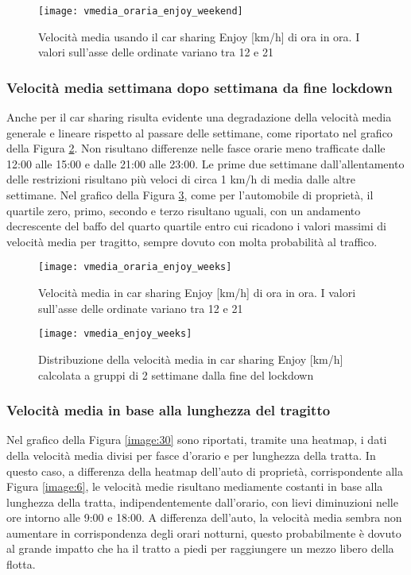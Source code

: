 \begin{figure}[H]
	\centering
	\texttt{[image: vmedia\_oraria\_enjoy\_weekend]}
	\caption{Velocità media usando il car sharing Enjoy [km/h] di ora in ora. I valori sull'asse delle ordinate variano tra 12 e 21}
	\label{image:20}
\end{figure}

\subsubsection{Velocità media settimana dopo settimana da fine lockdown}

Anche per il car sharing risulta evidente una degradazione della velocità media generale e lineare rispetto al passare delle settimane, come riportato nel grafico della Figura \ref{image:16}. Non risultano differenze nelle fasce orarie meno trafficate dalle 12:00 alle 15:00 e dalle 21:00 alle 23:00. Le prime due settimane dall'allentamento delle restrizioni risultano più veloci di circa 1 km/h di media dalle altre settimane. Nel grafico della Figura \ref{image:28}, come per l'automobile di proprietà, il quartile zero, primo, secondo e terzo risultano uguali, con un andamento decrescente del baffo del quarto quartile entro cui ricadono i valori massimi di velocità media per tragitto, sempre dovuto con molta probabilità al traffico.

\begin{figure}[H]
	\centering
	\texttt{[image: vmedia\_oraria\_enjoy\_weeks]}
	\caption{Velocità media in car sharing Enjoy [km/h] di ora in ora. I valori sull'asse delle ordinate variano tra 12 e 21}
	\label{image:16}
\end{figure}

\begin{figure}
	\centering
	\texttt{[image: vmedia\_enjoy\_weeks]}
	\caption{Distribuzione della velocità media in car sharing Enjoy [km/h] calcolata a gruppi di 2 settimane dalla fine del lockdown}
	\label{image:28}
\end{figure}

\subsubsection{Velocità media in base alla lunghezza del tragitto}

Nel grafico della Figura \ref{image:30} sono riportati, tramite una heatmap, i dati della velocità media divisi per fasce d'orario e per lunghezza della tratta. In questo caso, a differenza della heatmap dell'auto di proprietà, corrispondente alla Figura \ref{image:6}, le velocità medie risultano mediamente costanti in base alla lunghezza della tratta, indipendentemente dall'orario, con lievi diminuzioni nelle ore intorno alle 9:00 e 18:00. A differenza dell'auto, la velocità media sembra non aumentare in corrispondenza degli orari notturni, questo probabilmente è dovuto al grande impatto che ha il tratto a piedi per raggiungere un mezzo libero della flotta.

